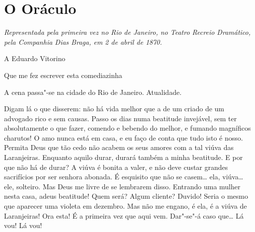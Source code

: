 \chapter[O Oráculo]{O Oráculo}

\textit{Representada pela primeira vez no Rio de Janeiro, no Teatro
Recreio Dramático, pela Companhia Dias Braga,
em 2 de abril de 1870.}

\hfill A Eduardo Vitorino

\hfill Que me fez escrever esta comediazinha

\castpage


\vfil
A cena passa"-se na cidade do Rio de Janeiro. Atualidade.

\pagebreak





   Digam lá o que disserem: não há vida
melhor que a de um criado de um advogado rico e sem causas. Passo os
dias numa beatitude invejável, sem ter absolutamente o que fazer,
comendo e bebendo do melhor, e fumando magníficos charutos! O amo nunca
está em casa, e eu faço de conta que tudo isto é nosso. Permita Deus
que tão cedo não acabem os seus amores com a tal viúva das Laranjeiras.
Enquanto aquilo durar, durará também a minha beatitude. E por que não
há de durar? A viúva é bonita a valer, e não deve custar grandes
sacrifícios por ser senhora abonada.  É
esquisito que não se casem\ldots{} ela, viúva\ldots{} ele, solteiro. Mas Deus me
livre de se lembrarem disso. Entrando uma mulher nesta casa, adeus
beatitude!  Quem será? Algum cliente? Duvido! Seria o mesmo
que aparecer uma violeta em dezembro.  Mas não me engano, é ela, é a viúva
de Laranjeiras! Ora esta! É a primeira vez que aqui vem. Dar"-se"-á caso
que\ldots{}  Lá vou! Lá vou!

